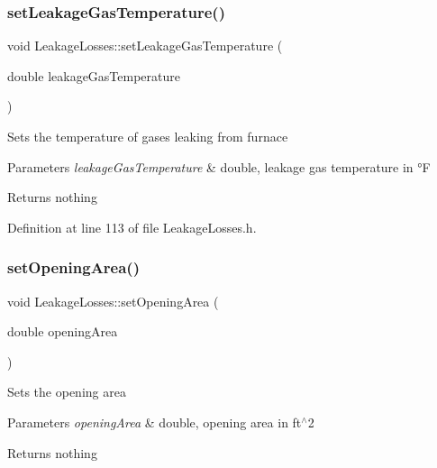 \subsubsection{\texorpdfstring{set\+Leakage\+Gas\+Temperature()}{setLeakageGasTemperature()}\hspace{0.1cm}{\footnotesize\ttfamily [3/3]}}
{\footnotesize\ttfamily void Leakage\+Losses\+::set\+Leakage\+Gas\+Temperature (\begin{DoxyParamCaption}\item[{double}]{leakage\+Gas\+Temperature }\end{DoxyParamCaption})\hspace{0.3cm}{\ttfamily [inline]}}

Sets the temperature of gases leaking from furnace


\begin{DoxyParams}{Parameters}
{\em leakage\+Gas\+Temperature} & double, leakage gas temperature in °F\\
\hline
\end{DoxyParams}
\begin{DoxyReturn}{Returns}
nothing 
\end{DoxyReturn}


Definition at line 113 of file Leakage\+Losses.\+h.

\mbox{\label{class_leakage_losses_a417c9914af6b283695bdbd5e92451f9e}} 
\subsubsection{\texorpdfstring{set\+Opening\+Area()}{setOpeningArea()}\hspace{0.1cm}{\footnotesize\ttfamily [1/3]}}
{\footnotesize\ttfamily void Leakage\+Losses\+::set\+Opening\+Area (\begin{DoxyParamCaption}\item[{double}]{opening\+Area }\end{DoxyParamCaption})\hspace{0.3cm}{\ttfamily [inline]}}

Sets the opening area


\begin{DoxyParams}{Parameters}
{\em opening\+Area} & double, opening area in ft$^\wedge$2\\
\hline
\end{DoxyParams}
\begin{DoxyReturn}{Returns}
nothing 
\end{DoxyReturn}


